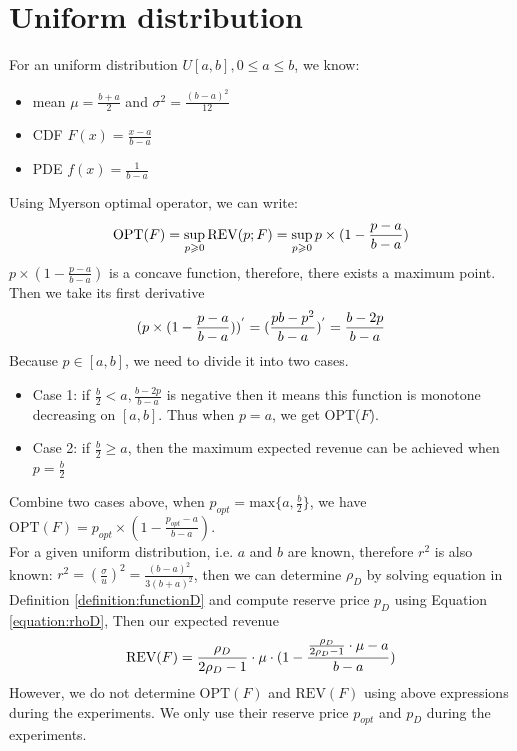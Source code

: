 \section{Uniform distribution}
For an uniform distribution $U[a,b], 0\leqslant a\leqslant b$, we know:
\begin{itemize}
	\item mean $\mu = \frac{b+a}{2}$ and $\sigma^{2} = \frac{(b-a)^{2}}{12}$
	\item CDF $F(x) = \frac {x-a}{b-a} $ 
	\item PDE $f(x) = \frac{1}{b-a}$
\end{itemize}
Using Myerson optimal operator, we can write:
\begin{equation}\notag
\text{OPT}(F) = \sup_{p \geqslant 0} \text{REV}(p;F) = \sup_{p \geqslant 0} p \times (1-\frac {p-a}{b-a}) 
\end{equation}
$p \times (1-\frac {p-a}{b-a})$ is a concave function, therefore, there exists a maximum point. Then we take its first derivative 
\begin{equation}\notag
	(p \times (1-\frac {p-a}{b-a}))^{'}  = (\frac {pb-p^2}{b-a})^{'} = \frac {b-2p}{b-a} 
\end{equation}
Because $p \in [a, b]$, we need to divide it into two cases.
\begin{itemize}
	\item Case 1: if $\frac{b}{2} < a, \frac {b-2p}{b-a}$ is negative then it means this function is monotone decreasing on $[a, b]$. Thus when $p = a$, we get OPT($F$). 
	\item Case 2: if $\frac{b}{2} \geqslant a $, then the maximum expected revenue can be achieved when $p = \frac{b}{2}$ 
\end{itemize}
Combine two cases above, when $p_{opt} =\text{max} \{a, \frac{b}{2} \}$, we have $\text{OPT}(F) =p_{opt} \times (1-\frac {p_{opt}-a}{b-a})$.\\
For a given uniform distribution, i.e. $a$ and $b$ are known, therefore $r^{2}$ is also known: $r^{2} = (\frac{\sigma}{u})^{2} = \frac{(b-a)^{2}}{3(b+a)^{2}}$, then we can determine $\rho_{D}$ by solving equation in Definition \ref{definition:functionD} and compute reserve price $p_D$ using Equation \ref{equation:rhoD}, Then our expected revenue
\begin{equation}\notag
	\text{REV} (F) = \frac{\rho_{D}}{2\rho_{D}-1}\cdot \mu \cdot (1-\frac{\frac{\rho_{D}}{2\rho_{D}-1}\cdot \mu -a}{b-a})
\end{equation}
However, we do not determine $\text{OPT}(F)$ and $\text{REV}(F)$ using above expressions during the experiments. We only use their reserve price $p_{opt}$ and $p_D$ during the experiments.

